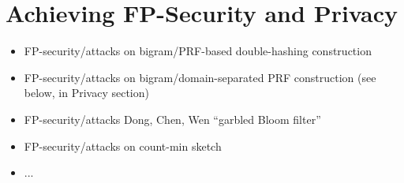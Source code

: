\section{Achieving FP-Security and Privacy}
\begin{itemize}
\item FP-security/attacks on bigram/PRF-based double-hashing construction 
\item FP-security/attacks on bigram/domain-separated PRF construction (see below, in Privacy section)
\item FP-security/attacks Dong, Chen, Wen ``garbled Bloom filter''
\item FP-security/attacks on count-min sketch
\item ...
\end{itemize}

